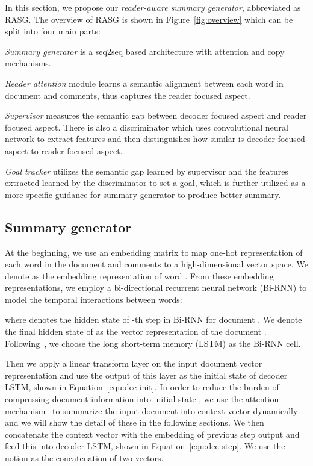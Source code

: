 \documentclass[letterpaper]{article} \usepackage{aaai19}  \usepackage{times}  \usepackage{helvet}  \usepackage{courier}
\begin{document}
In this section, we propose our \emph{reader-aware summary generator}, abbreviated as RASG. 
The overview of RASG is shown in Figure~\ref{fig:overview} which can be split into four main parts:

 \textit{Summary generator} is a seq2seq based architecture with attention and copy mechanisms.

 \textit{Reader attention} module learns a semantic alignment between each word in document and comments, thus captures the reader focused aspect.

 \textit{Supervisor} measures the semantic gap between decoder focused aspect and reader focused aspect.
There is also a discriminator which uses convolutional neural network to extract features and then distinguishes how similar is decoder focused aspect to reader focused aspect.

 \textit{Goal tracker} utilizes the semantic gap learned by supervisor and the features extracted learned by the discriminator to set a goal, which is further utilized as a more specific guidance for summary generator to produce better summary.



\subsection{Summary generator}

At the beginning, we use an embedding matrix  to map one-hot representation of each word in the document  and comments  to a high-dimensional vector space.
We denote  as the embedding representation of word .
From these embedding representations, we employ a bi-directional recurrent neural network (Bi-RNN) to model the temporal interactions between words:

\noindent where  denotes the hidden state of -th step in Bi-RNN for document . 
We denote the final hidden state  of  as the vector representation of the document .
Following~\cite{see2017get,Ma2018AHE}, we choose the long short-term memory (LSTM) as the Bi-RNN cell. 

Then we apply a linear transform layer on the input document vector representation  and use the output of this layer as the initial state of decoder LSTM, shown in Equation~\ref{equ:dec-init}.
In order to reduce the burden of compressing document information into initial state , we use the attention mechanism~\cite{Bahdanau2014NeuralMT} to summarize the input document into context vector  dynamically and we will show the detail of these in the following sections.
We then concatenate the context vector  with the embedding of previous step output  and feed this into decoder LSTM, shown in Equation~\ref{equ:dec-step}.
We use the notion  as the concatenation of two vectors.
\end{document}
